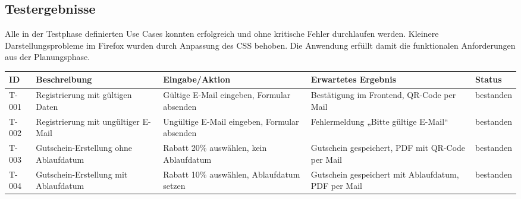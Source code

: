 \subsection{Testergebnisse}
\label{sec:Testergebnisse}
Alle in der Testphase definierten Use Cases konnten erfolgreich und ohne kritische Fehler durchlaufen werden.
Kleinere Darstellungsprobleme im Firefox wurden durch Anpassung des CSS behoben.
Die Anwendung erfüllt damit die funktionalen Anforderungen aus der Planungsphase.

\begin{center}
\label{tab:testergebnisse1}
\begin{tabularx}{\textwidth}{|L{1.2cm}|X|L{3.2cm}|L{3.2cm}|L{1.6cm}|}
\hline
\textbf{ID} & \textbf{Beschreibung} & \textbf{Eingabe/Aktion} & \textbf{Erwartetes Ergebnis} & \textbf{Status} \\
\hline
T-001 & Registrierung mit gültigen Daten & Gültige E-Mail eingeben, Formular absenden & Bestätigung im Frontend, QR-Code per Mail & bestanden \\
\hline
T-002 & Registrierung mit ungültiger E-Mail & Ungültige E-Mail eingeben, Formular absenden & Fehlermeldung „Bitte gültige E-Mail“ & bestanden \\
\hline
T-003 & Gutschein-Erstellung ohne Ablaufdatum & Rabatt 20\% auswählen, kein Ablaufdatum & Gutschein gespeichert, PDF mit QR-Code per Mail & bestanden \\
\hline
T-004 & Gutschein-Erstellung mit Ablaufdatum & Rabatt 10\% auswählen, Ablaufdatum setzen & Gutschein gespeichert mit Ablaufdatum, PDF per Mail & bestanden \\
\hline
\end{tabularx}
\end{center}

\newpage

